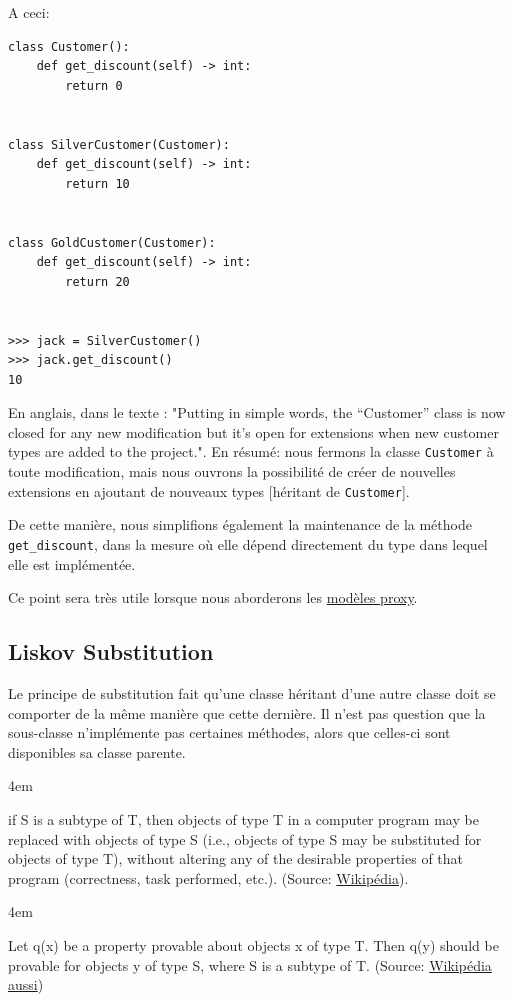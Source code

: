 \documentclass[11pt]{amsbook}
\renewenvironment{quotation}
{   \leftskip 4em \begin{em} }
{\end{em}\par }
\begin{document}
A ceci:


\begin{verbatim}
class Customer():
    def get_discount(self) -> int:
        return 0


class SilverCustomer(Customer):
    def get_discount(self) -> int:
        return 10


class GoldCustomer(Customer):
    def get_discount(self) -> int:
        return 20


>>> jack = SilverCustomer()
>>> jack.get_discount()
10
\end{verbatim}

En anglais, dans le texte : "Putting in simple words, the “Customer” class is now closed for any new modification but it’s open for extensions when new customer types are added to the project.". En résumé: nous fermons la classe \texttt{Customer} à toute modification, mais nous ouvrons la possibilité de créer de nouvelles extensions en ajoutant de nouveaux types [héritant de \texttt{Customer}].


De cette manière, nous simplifions également la maintenance de la méthode \texttt{get\_discount}, dans la mesure où elle dépend directement du type dans lequel elle est implémentée.


Ce point sera très utile lorsque nous aborderons les \href{https://docs.djangoproject.com/en/3.1/topics/db/models/#proxy-models}{modèles proxy}.


\hypertarget{x-liskov-substitution}{\subsection{Liskov Substitution}}
Le principe de substitution fait qu’une classe héritant d’une autre classe doit se comporter de la même manière que cette dernière.
Il n’est pas question que la sous-classe n’implémente pas certaines méthodes, alors que celles-ci sont disponibles sa classe parente.


\begin{quotation}
[…​] if S is a subtype of T, then objects of type T in a computer program may be replaced with objects of type S (i.e., objects of type S may be substituted for objects of type T), without altering any of the desirable properties of that program (correctness, task performed, etc.). (Source: \href{http://en.wikipedia.org/wiki/Liskov_substitution_principle}{Wikipédia}).
\end{quotation}

\begin{quotation}
Let q(x) be a property provable about objects x of type T. Then q(y) should be provable for objects y of type S, where S is a subtype of T. (Source: \href{http://en.wikipedia.org/wiki/Liskov_substitution_principle}{Wikipédia aussi})
\end{quotation}
\end{document}
